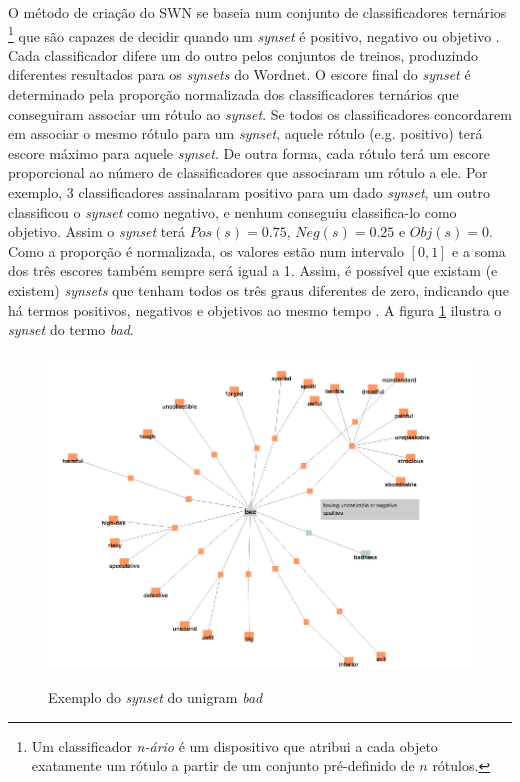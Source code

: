  
O método de criação do SWN se baseia num conjunto de classificadores ternários \footnote{Um classificador \textit{n-ário} é um dispositivo que atribui a cada objeto exatamente um rótulo a partir de um conjunto pré-definido de $n$ rótulos.} que são capazes de decidir quando um \textit{synset} é positivo, negativo ou objetivo \cite{esuli2006sentiwordnet}. Cada classificador difere um do outro pelos conjuntos de treinos, produzindo diferentes resultados para os \textit{synsets} do Wordnet. O escore final do \textit{synset} é determinado pela proporção normalizada dos classificadores ternários que conseguiram associar um rótulo ao \textit{synset}. Se todos os classificadores concordarem em associar o mesmo rótulo para um \textit{synset}, aquele rótulo (e.g. positivo) terá escore máximo para aquele \textit{synset}. De outra forma, cada rótulo terá um escore proporcional ao número de classificadores que associaram um rótulo a ele. Por exemplo, 3 classificadores assinalaram positivo para um dado \textit{synset}, um outro classificou o \textit{synset} como negativo, e nenhum conseguiu classifica-lo como objetivo. Assim o \textit{synset} terá $Pos(s) = 0.75$, $Neg(s) = 0.25$ e $Obj(s) = 0$. Como a proporção é normalizada, os valores estão num intervalo $[0,1]$ e a soma dos três escores também sempre será igual a 1. Assim, é possível que existam (e existem) \textit{synsets} que tenham todos os três graus diferentes de zero, indicando que há termos positivos, negativos e objetivos ao mesmo tempo \cite{esuli2006sentiwordnet}. A figura \ref{figura:bad_synset} ilustra o \textit{synset} do termo \textit{bad}.

\begin{figure}[h]
\caption{Exemplo do \textit{synset} do unigram \textit{bad}}
\centering
\includegraphics[scale=0.5]{bad_synset}
\label{figura:bad_synset}
\end{figure}
 
